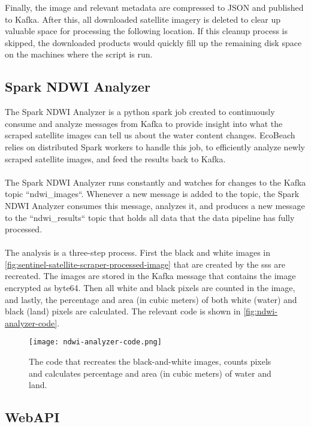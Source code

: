 Finally, the image and relevant metadata are compressed to JSON and published to Kafka. After this, all downloaded satellite imagery is deleted to clear up valuable space for processing the following location. If this cleanup process is skipped, the downloaded products would quickly fill up the remaining disk space on the machines where the script is run.

\subsection{Spark NDWI Analyzer}\label{subsec:ndwi-analyzer}

The Spark NDWI Analyzer is a python spark job created to continuously consume and analyze messages from Kafka to provide insight into what the scraped satellite images can tell us about the water content changes. EcoBeach relies on distributed Spark workers to handle this job, to efficiently analyze newly scraped satellite images, and feed the results back to Kafka.\\\\
\noindent
The Spark NDWI Analyzer runs constantly and watches for changes to the Kafka topic ``ndwi\_images``. Whenever a new message is added to the topic, the Spark NDWI Analyzer consumes this message, analyzes it, and produces a new message to the ``ndwi\_results`` topic that holds all data that the data pipeline has fully processed.\\\\
\noindent
The analysis is a three-step process. First the black and white images in \autoref{fig:sentinel-satellite-scraper-processed-image} that are created by the \acrshort{sss} are recreated. The images are stored in the Kafka message that contains the image encrypted as byte64. Then all white and black pixels are counted in the image, and lastly, the percentage and area (in cubic meters) of both white (water) and black (land) pixels are calculated. The relevant code is shown in \autoref{fig:ndwi-analyzer-code}.

\begin{figure}[H]
    \centering
    \texttt{[image: ndwi-analyzer-code.png]}
    \caption{The code that recreates the black-and-white images, counts pixels and calculates percentage and area (in cubic meters) of water and land.}
    \label{fig:ndwi-analyzer-code}
\end{figure}

\subsection{WebAPI}

